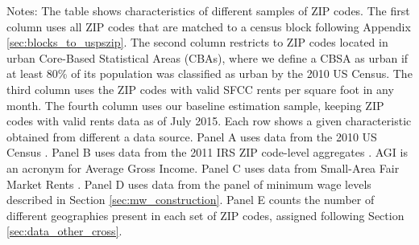 \begin{landscape}
\begin{table}[hbt!]
    \begin{minipage}{.95\linewidth} \footnotesize
        \vspace{2mm}
        Notes: The table shows characteristics of different samples of ZIP codes.
        The first column uses all ZIP codes that are matched to a census block
        following Appendix \ref{sec:blocks_to_uspszip}.
        The second column restricts to ZIP codes located in urban Core-Based
        Statistical Areas (CBAs), where we define a CBSA as urban if at least
        80\% of its population was classified as urban by the 2010 US Census.
        The third column uses the ZIP codes with valid SFCC rents per square 
        foot in any month.
        The fourth column uses our baseline estimation sample, keeping ZIP codes
        with valid rents data as of July 2015.
        Each row shows a given characteristic obtained from different a data 
        source.
        Panel A uses data from the 2010 US Census \parencite{CensusDecennial}.
        Panel B uses data from the 2011 IRS ZIP code-level aggregates
        \parencite{IRS}. AGI is an acronym for Average Gross Income.
        Panel C uses data from Small-Area Fair Market Rents \parencite[SAFMR;][]{hudSAFMR}.
        Panel D uses data from the panel of minimum wage levels described in 
        Section \ref{sec:mw_construction}.
        Panel E counts the number of different geographies present in each set
        of ZIP codes, assigned following Section \ref{sec:data_other_cross}.
    \end{minipage}
\end{table}
\end{landscape}
